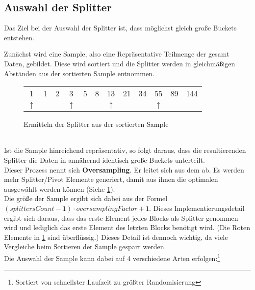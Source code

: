 	\subsection{Auswahl der Splitter}
		Das Ziel bei der Auswahl der Splitter ist, dass möglichst gleich große Buckets entstehen.
		
		Zunächst wird eine Sample, also eine Repräsentative Teilmenge der gesamt Daten, gebildet.
		Diese wird sortiert und die Splitter werden in gleichmäßigen Abständen aus der sortierten Sample entnommen.\\
		\begin{figure}[h]
			\caption{Ermitteln der Splitter aus der sortierten Sample \autocite{benson-2022}}
			\label{fig:splitters-from-sample}
			\begin{center}
				\begin{tabular}{ c c c c c c c c c c c c }
						 1     & 1 & 2 &      3     & 5 & 8 &     13     & 21 & 34 &     55     & {\color{red} 89} & {\color{red} 144} \\
					$\uparrow$ &   &   & $\uparrow$ &   &   & $\uparrow$ &    &    & $\uparrow$ &                  &
				\end{tabular}
			\end{center}
		\end{figure}\\
		Ist die Sample hinreichend repräsentativ, so folgt daraus, dass die resultierenden Splitter die Daten in annähernd identisch große Buckets unterteilt.\\
		Dieser Prozess nennt sich \textbf{Oversampling}.
		Er leitet sich aus dem  ab.
		Es werden mehr Splitter/Pivot Elemente generiert, damit aus ihnen die optimalen ausgewählt werden können (Siehe \ref{fig:splitters-from-sample}).\\
		Die größe der Sample ergibt sich dabei aus der Formel $(\textit{splittersCount}-1)\cdot\textit{oversamplingFactor}+1$.
		Dieses Implementierungsdetail ergibt sich daraus, dass das erste Element jedes Blocks als Splitter genommen wird und lediglich das erste Element des letzten Blocks benötigt wird. (Die Roten Elemente in \ref{fig:splitters-from-sample} sind überflüssig.)
		Dieses Detail ist dennoch wichtig, da viele Vergleiche beim Sortieren der Sample gespart werden.\\
		Die Auswahl der Sample kann dabei auf 4 verschiedene Arten erfolgen:\footnote{Sortiert von schnellster Laufzeit zu größter Randomisierung} \autocite{berlin-2007}

